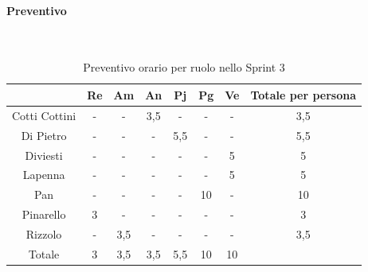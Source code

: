 \documentclass{article}
\begin{document}
                \paragraph{Preventivo}\mbox{}\\
                \begin{table}[H]
                    \centering
                    \begin{tabular}{|c|c|c|c|c|c|c|c|}
                    \hline
                                    & Re  & Am  & An  & Pj  & Pg  & Ve  & Totale per persona \\ \hline
                    Cotti Cottini & -   & -   & 3,5 & -   & -   & -   & 3,5                \\ \hline
                    Di Pietro     & -   & -   & -   & 5,5 & -   & -   & 5,5                \\ \hline
                    Diviesti      & -   & -   & -   & -   & -   & 5   & 5                  \\ \hline
                    Lapenna       & -   & -   & -   & -   & -   & 5   & 5                  \\ \hline
                    Pan           & -   & -   & -   & -   & 10  & -   & 10                 \\ \hline
                    Pinarello     & 3   & -   & -   & -   & -   & -   & 3                  \\ \hline
                    Rizzolo       & -   & 3,5 & -   & -   & -   & -   & 3,5                \\ \hline
                    Totale        & 3   & 3,5 & 3,5 & 5,5 & 10  & 10  &                    \\ \hline
                    \end{tabular}
                    \caption{Preventivo orario per ruolo nello Sprint 3}
                \end{table}

\end{document}
